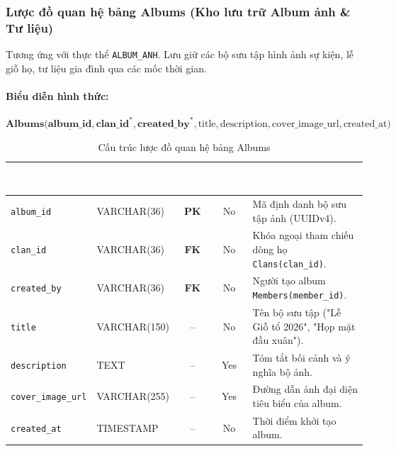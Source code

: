 \subsubsection{Lược đồ quan hệ bảng Albums (Kho lưu trữ Album ảnh \& Tư liệu)}
Tương ứng với thực thể \texttt{ALBUM\_ANH}. Lưu giữ các bộ sưu tập hình ảnh sự kiện, lễ giỗ họ, tư liệu gia đình qua các mốc thời gian.

\paragraph{Biểu diễn hình thức:}
\[
\textbf{Albums}\big(
\underline{\textbf{album\_id}}, \textbf{clan\_id}^*, \textbf{created\_by}^*, \text{title}, \text{description}, \text{cover\_image\_url}, \text{created\_at}
\big)
\]

\begin{table}[H]
    \centering
    \small
    \renewcommand{\arraystretch}{1.2}
    \begin{tabularx}{\textwidth}{p{3.2cm} p{2.6cm} c c X}
        \toprule
        \rowcolor{tableheader}\textcolor{white}{\textbf{Tên thuộc tính}} & \textcolor{white}{\textbf{Kiểu logic}} & \textcolor{white}{\textbf{Khóa}} & \textcolor{white}{\textbf{Null?}} & \textcolor{white}{\textbf{Diễn giải \& Ràng buộc tham chiếu}} \\
        \midrule
        \rowcolor{tablerowalt}
        \texttt{album\_id} & VARCHAR(36) & \textcolor{pkcolor}{\textbf{PK}} & No & Mã định danh bộ sưu tập ảnh (UUIDv4). \\
        \texttt{clan\_id} & VARCHAR(36) & \textcolor{fkcolor}{\textbf{FK}} & No & Khóa ngoại tham chiếu dòng họ \texttt{Clans(clan\_id)}. \\
        \rowcolor{tablerowalt}
        \texttt{created\_by} & VARCHAR(36) & \textcolor{fkcolor}{\textbf{FK}} & No & Người tạo album \texttt{Members(member\_id)}. \\
        \texttt{title} & VARCHAR(150) & -- & No & Tên bộ sưu tập ("Lễ Giỗ tổ 2026", "Họp mặt đầu xuân"). \\
        \rowcolor{tablerowalt}
        \texttt{description} & TEXT & -- & Yes & Tóm tắt bối cảnh và ý nghĩa bộ ảnh. \\
        \texttt{cover\_image\_url} & VARCHAR(255) & -- & Yes & Đường dẫn ảnh đại diện tiêu biểu của album. \\
        \rowcolor{tablerowalt}
        \texttt{created\_at} & TIMESTAMP & -- & No & Thời điểm khởi tạo album. \\
        \bottomrule
    \end{tabularx}
    \caption{Cấu trúc lược đồ quan hệ bảng Albums}
    \label{tab:schema_albums}
\end{table}

